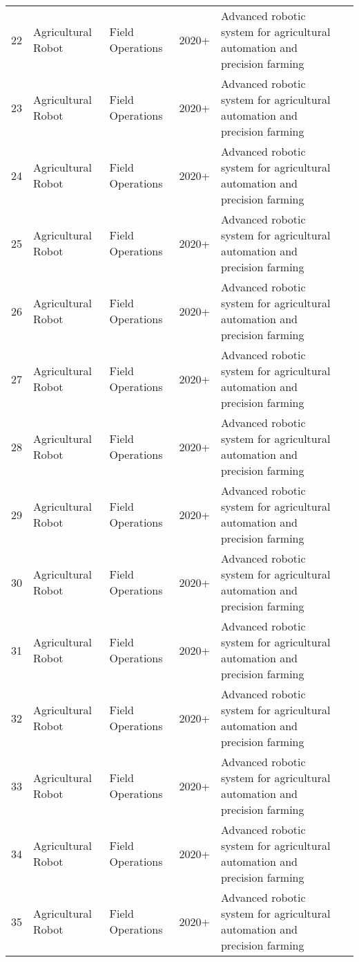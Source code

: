 \begin{table*}[htbp]
\begin{tabular}{p{}p{}p{}p{}p{}p{}}
 22 & Agricultural Robot & Field Operations & 2020+ & Advanced robotic system for agricultural automation and precision farming & \cite{bormann2018indoor} \\
 23 & Agricultural Robot & Field Operations & 2020+ & Advanced robotic system for agricultural automation and precision farming & \cite{verbiest2022path} \\
 24 & Agricultural Robot & Field Operations & 2020+ & Advanced robotic system for agricultural automation and precision farming & \cite{borenstein1991vfh} \\
 25 & Agricultural Robot & Field Operations & 2020+ & Advanced robotic system for agricultural automation and precision farming & \cite{fox1997dynamic} \\
 26 & Agricultural Robot & Field Operations & 2020+ & Advanced robotic system for agricultural automation and precision farming & \cite{lillicrap2015continuous} \\
 27 & Agricultural Robot & Field Operations & 2020+ & Advanced robotic system for agricultural automation and precision farming & \cite{hart1968formal} \\
 28 & Agricultural Robot & Field Operations & 2020+ & Advanced robotic system for agricultural automation and precision farming & \cite{Loganathan:2023_hho} \\
 29 & Agricultural Robot & Field Operations & 2020+ & Advanced robotic system for agricultural automation and precision farming & \cite{Loganathan:2024_hho_avoa} \\
 30 & Agricultural Robot & Field Operations & 2020+ & Advanced robotic system for agricultural automation and precision farming & \cite{Loganathan:2023_amr} \\
 31 & Agricultural Robot & Field Operations & 2020+ & Advanced robotic system for agricultural automation and precision farming & \cite{lytridis2021overview} \\
 32 & Agricultural Robot & Field Operations & 2020+ & Advanced robotic system for agricultural automation and precision farming & \cite{aguiar2020localization} \\
 33 & Agricultural Robot & Field Operations & 2020+ & Advanced robotic system for agricultural automation and precision farming & \cite{wang2016localisation} \\
 34 & Agricultural Robot & Field Operations & 2020+ & Advanced robotic system for agricultural automation and precision farming & \cite{si2015location} \\
 35 & Agricultural Robot & Field Operations & 2020+ & Advanced robotic system for agricultural automation and precision farming & \cite{underwood2016mapping} \\

\end{tabular}
\end{table*}
